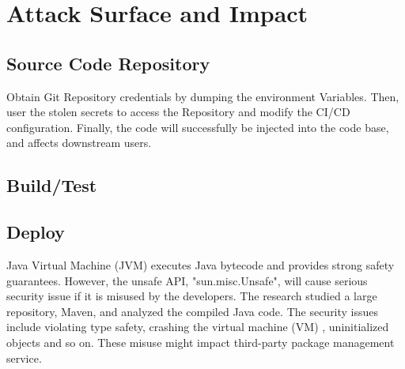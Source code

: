 \section{Attack Surface and Impact}

\subsection{Source Code Repository}
Obtain Git Repository credentials by dumping the environment Variables. Then, user
the stolen secrets to access the Repository and modify the CI/CD configuration.
Finally, the code will successfully be injected into the code base, and affects
downstream users.

\subsection{Build/Test}
\subsection{Deploy}
Java Virtual Machine (JVM) executes Java bytecode and provides strong safety
guarantees. However, the unsafe API, "sun.misc.Unsafe", will cause serious 
security issue if it is misused by the developers. The research \cite{mastrangelo2015use} 
studied a large repository, Maven, and analyzed the compiled Java code. The 
security issues include violating type safety, crashing the virtual machine (VM)
, uninitialized objects and so on. These misuse might impact third-party package 
management service. 